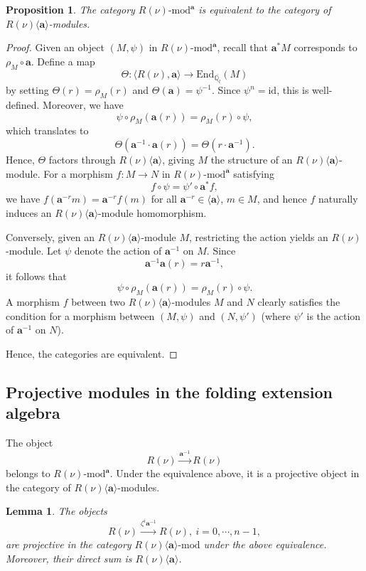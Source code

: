 \documentclass[10pt,a4paper]{amsart}
\newtheorem{lemma}[theorem]{Lemma}
\newtheorem{proposition}[theorem]{Proposition}
\newcommand\bbq{{\mathbb Q}}
\begin{document}
\begin{proposition}
The category $R(\nu)\text{-}\mathrm{mod}^\mathbf{a}$ is equivalent to the category of $R(\nu)\langle\mathbf{a}\rangle$-modules.
\end{proposition}

\begin{proof}
Given an object $(M,\psi)$ in $R(\nu)\text{-}\mathrm{mod}^\mathbf{a}$, recall that $\mathbf{a}^*M$ corresponds to $\rho_M \circ \mathbf{a}$. Define a map
\[
\Theta : \langle R(\nu), \mathbf{a} \rangle \to \mathrm{End}_{\overline{\bbq_l}}(M)
\]
by setting $\Theta(r) = \rho_M(r)$ and $\Theta(\mathbf{a}) = \psi^{-1}$. Since $\psi^n = \mathrm{id}$, this is well-defined. Moreover, we have
\[
\psi \circ \rho_M(\mathbf{a}(r)) = \rho_M(r) \circ \psi,
\]
which translates to
\[
\Theta(\mathbf{a}^{-1} \cdot \mathbf{a}(r)) = \Theta(r \cdot \mathbf{a}^{-1}).
\]
Hence, $\Theta$ factors through $R(\nu)\langle\mathbf{a}\rangle$, giving $M$ the structure of an $R(\nu)\langle\mathbf{a}\rangle$-module. For a morphism $f : M \to N$ in $R(\nu)\text{-}\mathrm{mod}^\mathbf{a}$ satisfying
\[
f \circ \psi = \psi' \circ \mathbf{a}^* f,
\]
we have $f(\mathbf{a}^{-r} m) = \mathbf{a}^{-r} f(m)$ for all $\mathbf{a}^{-r} \in \langle\mathbf{a} \rangle$, $m \in M$, and hence $f$ naturally induces an $R(\nu)\langle\mathbf{a}\rangle$-module homomorphism.

Conversely, given an $R(\nu)\langle\mathbf{a}\rangle$-module $M$, restricting the action yields an $R(\nu)$-module. Let $\psi$ denote the action of $\mathbf{a}^{-1}$ on $M$. Since
\[
\mathbf{a}^{-1} \mathbf{a}(r) = r \mathbf{a}^{-1},
\]
it follows that
\[
\psi \circ \rho_M(\mathbf{a}(r)) = \rho_M(r) \circ \psi.
\]
A morphism $f$ between two $R(\nu)\langle\mathbf{a}\rangle$-modules $M$ and $N$ clearly satisfies the condition for a morphism between $(M,\psi)$ and $(N,\psi')$ (where $\psi'$ is the action of $\mathbf{a}^{-1}$ on $N$).

Hence, the categories are equivalent.
\end{proof}
\subsection{Projective modules in the folding extension algebra}
The object
\[
R(\nu) \xrightarrow{\mathbf{a}^{-1}} R(\nu)
\]
belongs to $R(\nu)\text{-}\mathrm{mod}^\mathbf{a}$. Under the equivalence above, it is a projective object in the category of $R(\nu)\langle\mathbf{a}\rangle$-modules.

\begin{lemma}\label{pro}
The objects
\[
R(\nu) \xrightarrow{\zeta^i\mathbf{a}^{-1}} R(\nu),\ i=0,\cdots,n-1,
\]
are projective in the category $R(\nu)\langle\mathbf{a}\rangle\text{-}\mathrm{mod}$ under the above equivalence. Moreover, their direct sum is $R(\nu)\langle\mathbf{a}\rangle$.
\end{lemma}
\end{document}
